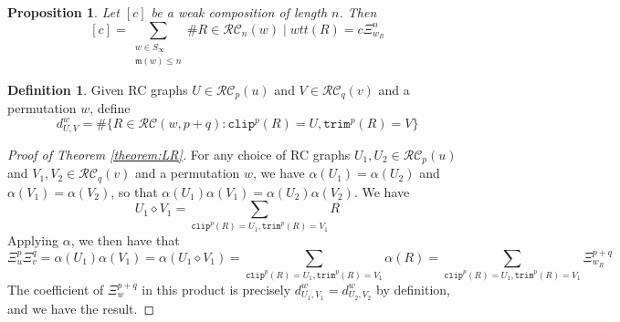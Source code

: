 \documentclass{amsart}
\newtheorem{proposition}[lemma]{Proposition}
\theoremstyle{definition}
\newtheorem{definition}[lemma]{Definition}
\theoremstyle{remark}
\numberwithin{equation}{subsection}
\newcommand{\R}{\mathbf{R}}  %
\newcommand{\wof}[1]{w_{#1}}
\newcommand{\trm}{\mathtt{trim}}
\newcommand{\hr}{\mathtt{ht}}
\newcommand{\clp}{\mathtt{clip}}
\newcommand{\RC}{\mathcal{RC}}
\newcommand{\dsch}{\ensuremath{\Xi}}
\newcommand{\maxd}{\mathfrak{m}}
\begin{document}
\begin{proposition}
Let $[c]$ be a weak composition of length $n$. Then
$$[c] = \sum_{\substack{w\in S_\infty\\\maxd(w)\leq n}}\#{R\in \RC_n(w)\mid wtt(R)=c} \dsch_{\wof{R}}^n$$
\end{proposition}


\begin{definition}
Given RC graphs $U\in \RC_p(u)$ and $V\in\RC_q(v)$ and a permutation $w$, define
$$d_{U, V}^w = \#\{R\in \RC(w, p + q): \clp^p(R)=U,\trm^p(R)=V\}$$
\end{definition}

\begin{proof}[Proof of Theorem \ref{theorem:LR}]
For any choice of RC graphs $U_1,U_2\in \RC_p(u)$ and $V_1,V_2\in\RC_q(v)$ and a permutation $w$, we have $\alpha(U_1) = \alpha(U_2)$ and $\alpha(V_1)=\alpha(V_2)$, so that $\alpha(U_1)\alpha(V_1) = \alpha(U_2)\alpha(V_2)$. We have
$$U_1\diamond V_1 = \sum_{\clp^p(R)=U_1,\trm^p(R)=V_1} R$$
Applying $\alpha$, we then have that
$$\dsch_u^p\dsch_v^q = \alpha(U_1)\alpha(V_1) = \alpha(U_1\diamond V_1) = \sum_{\clp^p(R)=U_1,\trm^p(R)=V_1} \alpha(R)=\sum_{\clp^p(R)=U_1,\trm^p(R)=V_1} \dsch_{\wof{R}}^{p+q}$$
The coefficient of $\dsch_w^{p+q}$ in this product is precisely $d_{U_1, V_1}^w=d_{U_2, V_2}^w$ by definition, and we have the result.
\end{proof}




\end{document}
